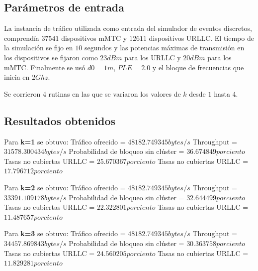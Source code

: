 \subsection{Parámetros de entrada}

La instancia de tráfico utilizada como entrada del simulador de eventos discretos, comprendía $37541$ dispositivos mMTC y $12611$ dispositivos URLLC. El tiempo de la simulación se fijo en $10$ segundos y las potencias máximas de transmisión en los dispositivos se fijaron como $23dBm$ para los URLLC y $20dBm$ para los mMTC. Finalmente se usó $d0=1m$, $PLE=2.0$ y el bloque de frecuencias que inicia en $2Ghz$. 

Se corrieron 4 rutinas en las que se variaron los valores de $k$ desde $1$ hasta $4$.

\subsection{Resultados obtenidos}
Para \textbf{k=1} se obtuvo:\newline
Tráfico ofrecido = $48182.749345 bytes/s$ \newline
Throughput = $31578.300434 bytes/s$ \newline
Probabilidad de bloqueo sin clúster = $36.674849 porciento$ \newline
Tasas no cubiertas URLLC = $25.670367 porciento$ \newline
Tasas no cubiertas URLLC = $17.796712 porciento$ \newline

Para \textbf{k=2} se obtuvo:\newline
Tráfico ofrecido = $48182.749345 bytes/s$ \newline
Throughput = $33391.109178 bytes/s$ \newline
Probabilidad de bloqueo sin clúster = $32.644499 porciento$ \newline
Tasas no cubiertas URLLC = $22.322801 porciento$ \newline
Tasas no cubiertas URLLC = $11.487657 porciento$ \newline

Para \textbf{k=3} se obtuvo:\newline
Tráfico ofrecido = $48182.749345 bytes/s$ \newline
Throughput = $34457.869843 bytes/s$ \newline
Probabilidad de bloqueo sin clúster = $30.363758 porciento$ \newline
Tasas no cubiertas URLLC = $24.560205 porciento$ \newline
Tasas no cubiertas URLLC = $11.829281 porciento$ \newline

